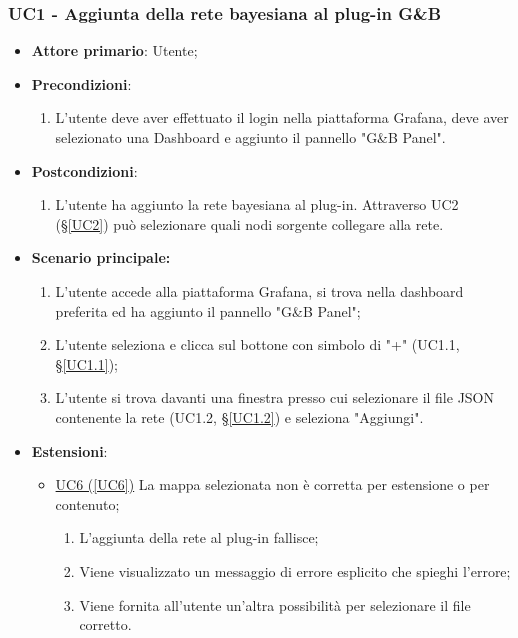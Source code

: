 \subsubsection{UC1 - Aggiunta della rete bayesiana al plug-in G\&B}\label{UC1}
\begin{itemize}
	\item \textbf{Attore primario}: Utente;
	\item \textbf{Precondizioni}:
		\begin{enumerate}
			\item L'utente deve aver effettuato il login nella piattaforma Grafana, deve aver selezionato una Dashboard e aggiunto il pannello "G\&B Panel".
		\end{enumerate}
	\item \textbf{Postcondizioni}: 
	\begin{enumerate}
		\item L'utente ha aggiunto la rete bayesiana al plug-in. Attraverso UC2 (§\ref{UC2}) può selezionare quali nodi sorgente collegare alla rete.
	\end{enumerate}
	\item \textbf{Scenario principale:}
	\begin{enumerate}
		\item L'utente accede alla piattaforma Grafana, si trova nella dashboard preferita ed ha aggiunto il pannello "G\&B Panel";
		\item L'utente seleziona e clicca sul bottone con simbolo di "+" (UC1.1, §\ref{UC1.1});
		\item L'utente si trova davanti una finestra presso cui selezionare il file JSON contenente la rete (UC1.2, §\ref{UC1.2}) e seleziona "Aggiungi".
	\end{enumerate}
	\item \textbf{Estensioni}:
	\begin{itemize}
		\item \hyperref[UC6]{UC6 (\ref*{UC6})} La mappa selezionata non è corretta per estensione o per contenuto;
		\begin{enumerate}
			\item L'aggiunta della rete al plug-in fallisce;
			\item Viene visualizzato un messaggio di errore esplicito che spieghi l'errore;
			\item Viene fornita all'utente un'altra possibilità per selezionare il file corretto.
		\end{enumerate}
	\end{itemize}
\end{itemize}

